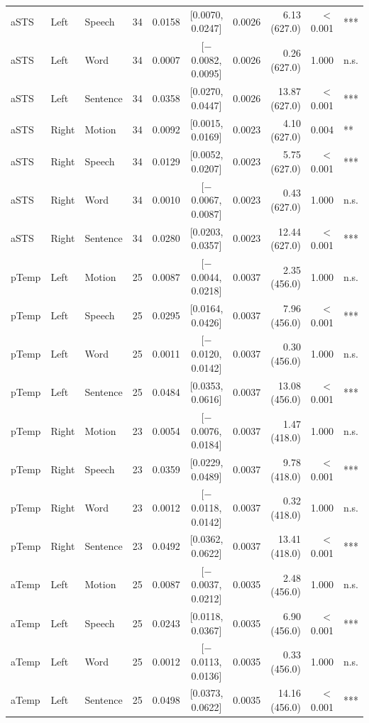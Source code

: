 \begin{table}[h]
\begin{tabular}{lllrrcrrrl}
aSTS & Left & Speech & 34 & 0.0158 & [0.0070, 0.0247] & 0.0026 & 6.13 (627.0) & $<$0.001 & *** \\
aSTS & Left & Word & 34 & 0.0007 & [$-$0.0082, 0.0095] & 0.0026 & 0.26 (627.0) & 1.000 & n.s. \\
aSTS & Left & Sentence & 34 & 0.0358 & [0.0270, 0.0447] & 0.0026 & 13.87 (627.0) & $<$0.001 & *** \\
aSTS & Right & Motion & 34 & 0.0092 & [0.0015, 0.0169] & 0.0023 & 4.10 (627.0) & 0.004 & ** \\
aSTS & Right & Speech & 34 & 0.0129 & [0.0052, 0.0207] & 0.0023 & 5.75 (627.0) & $<$0.001 & *** \\
aSTS & Right & Word & 34 & 0.0010 & [$-$0.0067, 0.0087] & 0.0023 & 0.43 (627.0) & 1.000 & n.s. \\
aSTS & Right & Sentence & 34 & 0.0280 & [0.0203, 0.0357] & 0.0023 & 12.44 (627.0) & $<$0.001 & *** \\
pTemp & Left & Motion & 25 & 0.0087 & [$-$0.0044, 0.0218] & 0.0037 & 2.35 (456.0) & 1.000 & n.s. \\
pTemp & Left & Speech & 25 & 0.0295 & [0.0164, 0.0426] & 0.0037 & 7.96 (456.0) & $<$0.001 & *** \\
pTemp & Left & Word & 25 & 0.0011 & [$-$0.0120, 0.0142] & 0.0037 & 0.30 (456.0) & 1.000 & n.s. \\
pTemp & Left & Sentence & 25 & 0.0484 & [0.0353, 0.0616] & 0.0037 & 13.08 (456.0) & $<$0.001 & *** \\
pTemp & Right & Motion & 23 & 0.0054 & [$-$0.0076, 0.0184] & 0.0037 & 1.47 (418.0) & 1.000 & n.s. \\
pTemp & Right & Speech & 23 & 0.0359 & [0.0229, 0.0489] & 0.0037 & 9.78 (418.0) & $<$0.001 & *** \\
pTemp & Right & Word & 23 & 0.0012 & [$-$0.0118, 0.0142] & 0.0037 & 0.32 (418.0) & 1.000 & n.s. \\
pTemp & Right & Sentence & 23 & 0.0492 & [0.0362, 0.0622] & 0.0037 & 13.41 (418.0) & $<$0.001 & *** \\
aTemp & Left & Motion & 25 & 0.0087 & [$-$0.0037, 0.0212] & 0.0035 & 2.48 (456.0) & 1.000 & n.s. \\
aTemp & Left & Speech & 25 & 0.0243 & [0.0118, 0.0367] & 0.0035 & 6.90 (456.0) & $<$0.001 & *** \\
aTemp & Left & Word & 25 & 0.0012 & [$-$0.0113, 0.0136] & 0.0035 & 0.33 (456.0) & 1.000 & n.s. \\
aTemp & Left & Sentence & 25 & 0.0498 & [0.0373, 0.0622] & 0.0035 & 14.16 (456.0) & $<$0.001 & *** \\

\end{tabular}
\end{table}
